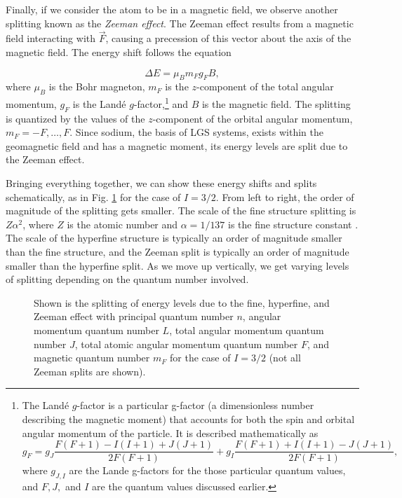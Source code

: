 Finally, if we consider the atom to be in a magnetic field, we observe another splitting known as the \textit{Zeeman effect}. The Zeeman effect results from a magnetic field interacting with $\vec F$, causing a precession of this vector about the axis of the magnetic field. The energy shift follows the equation

\begin{equation}
  \Delta E = \mu_B m_F g_F B,
  \label{zeeman}
\end{equation}
%
where $\mu_B$ is the Bohr magneton, $m_F$ is the $z$-component of the total angular momentum, $g_F$ is the Land\'{e} $g$-factor,\footnote{The Land\'{e} $g$-factor is a particular g-factor (a dimensionless number describing the magnetic moment) that accounts for both the spin and orbital angular momentum of the particle. It is described mathematically as 
  \begin{equation}
	g_F = g_J \frac{F(F+1) -I(I+1) + J(J+1)}{2F(F+1)} + g_I \frac{F(F+1) + I(I+1) -J(J+1)}{2F(F+1)},
	\label{lande}
  \end{equation}
%
where $g_{J,I}$ are the Lande g-factors for the those particular quantum values, and $F,J,$ and $I$ are the quantum values discussed earlier.} and $B$ is the magnetic field. The splitting is quantized by the values of the $z$-component of the orbital angular momentum, $m_F = -F, \dots, F$. Since sodium, the basis of LGS systems, exists within the geomagnetic field and has a magnetic moment, its energy levels are split due to the Zeeman effect.

Bringing everything together, we can show these energy shifts and splits schematically, as in Fig. \ref{fig:energysplitting} for the case of $I = 3/2$. From left to right, the order of magnitude of the splitting gets smaller. The scale of the fine structure splitting is $Z \alpha^2$, where $Z$ is the atomic number and $\alpha = 1/137$ is the fine structure constant \cite{feynman}. The scale of the hyperfine structure is typically an order of magnitude smaller than the fine structure, and the Zeeman split is typically an order of magnitude smaller than the hyperfine split. As we move up vertically, we get varying levels of splitting depending on the quantum number involved. 

\begin{figure}[ht]
	\centering
	
	\caption{Shown is the  splitting of energy levels due to the fine, hyperfine, and Zeeman effect with principal quantum number $n$, angular momentum quantum number $L$, total angular momentum quantum number $J$, total atomic angular momentum quantum number $F$, and magnetic quantum number $m_F$ for the case of $I = 3/2$ (not all Zeeman splits are shown).}
  \label{fig:energysplitting}
\end{figure}


